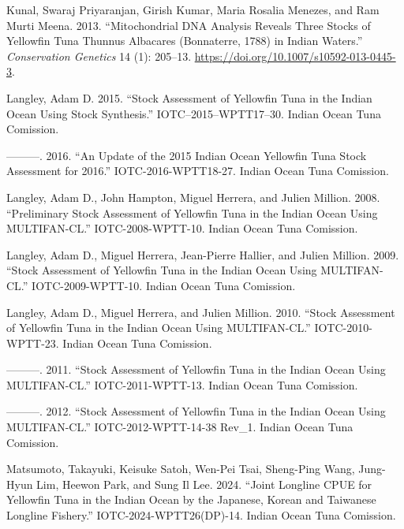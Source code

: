 \documentclass[
]{scrartcl}
\newlength{\cslhangindent}
\newenvironment{CSLReferences}[2] %
 {\begin{list}{}{%
  \setlength{\itemindent}{0pt}
  \setlength{\leftmargin}{0pt}
  \setlength{\parsep}{0pt}
  \ifodd #1
   \setlength{\leftmargin}{\cslhangindent}
   \setlength{\itemindent}{-1\cslhangindent}
  \fi
  \setlength{\itemsep}{#2\baselineskip}}}
 {\end{list}}
\begin{document}
\begin{CSLReferences}{1}{0}
Kunal, Swaraj Priyaranjan, Girish Kumar, Maria Rosalia Menezes, and Ram
Murti Meena. 2013. {``Mitochondrial {DNA} Analysis Reveals Three Stocks
of Yellowfin Tuna {Thunnus} Albacares ({Bonnaterre}, 1788) in {Indian}
Waters.''} \emph{Conservation Genetics} 14 (1): 205--13.
\url{https://doi.org/10.1007/s10592-013-0445-3}.

Langley, Adam D. 2015. {``Stock Assessment of Yellowfin Tuna in the
{Indian Ocean} Using {Stock Synthesis}.''} IOTC--2015--WPTT17--30.
Indian Ocean Tuna Comission.

---------. 2016. {``An Update of the 2015 {Indian Ocean Yellowfin Tuna}
Stock Assessment for 2016.''} IOTC-2016-WPTT18-27. Indian Ocean Tuna
Comission.

Langley, Adam D., John Hampton, Miguel Herrera, and Julien Million.
2008. {``Preliminary Stock Assessment of Yellowfin Tuna in the {Indian
Ocean} Using {MULTIFAN-CL}.''} IOTC-2008-WPTT-10. Indian Ocean Tuna
Comission.

Langley, Adam D., Miguel Herrera, Jean-Pierre Hallier, and Julien
Million. 2009. {``Stock Assessment of Yellowfin Tuna in the {Indian
Ocean} Using {MULTIFAN-CL}.''} IOTC-2009-WPTT-10. Indian Ocean Tuna
Comission.

Langley, Adam D., Miguel Herrera, and Julien Million. 2010. {``Stock
Assessment of Yellowfin Tuna in the {Indian Ocean} Using
{MULTIFAN-CL}.''} IOTC-2010-WPTT-23. Indian Ocean Tuna Comission.

---------. 2011. {``Stock Assessment of Yellowfin Tuna in the {Indian
Ocean} Using {MULTIFAN-CL}.''} IOTC-2011-WPTT-13. Indian Ocean Tuna
Comission.

---------. 2012. {``Stock Assessment of Yellowfin Tuna in the {Indian
Ocean} Using {MULTIFAN-CL}.''} IOTC-2012-WPTT-14-38 Rev\_1. Indian Ocean
Tuna Comission.

Matsumoto, Takayuki, Keisuke Satoh, Wen-Pei Tsai, Sheng-Ping Wang,
Jung-Hyun Lim, Heewon Park, and Sung Il Lee. 2024. {``Joint Longline
{CPUE} for Yellowfin Tuna in the {Indian Ocean} by the {Japanese},
{Korean} and {Taiwanese} Longline Fishery.''} IOTC-2024-WPTT26(DP)-14.
Indian Ocean Tuna Comission.


\end{CSLReferences}
\end{document}
